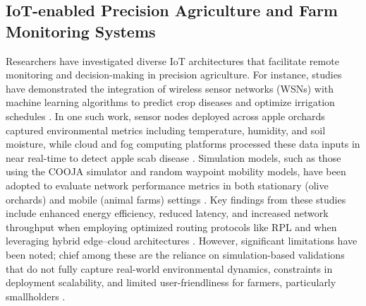 \documentclass[12pt,onecolumn]{IEEEtran} %
\begin{document}
\subsection{IoT-enabled Precision Agriculture and Farm Monitoring Systems}
Researchers have investigated diverse IoT architectures that facilitate remote monitoring and decision-making in precision agriculture. For instance, studies have demonstrated the integration of wireless sensor networks (WSNs) with machine learning algorithms to predict crop diseases and optimize irrigation schedules \cite{dhanaraju2022smartfarminginternet, akhter2022precisionagricultureusing}. In one such work, sensor nodes deployed across apple orchards captured environmental metrics including temperature, humidity, and soil moisture, while cloud and fog computing platforms processed these data inputs in near real-time to detect apple scab disease \cite{akhter2022precisionagricultureusing}. Simulation models, such as those using the COOJA simulator and random waypoint mobility models, have been adopted to evaluate network performance metrics in both stationary (olive orchards) and mobile (animal farms) settings \cite{jaliyagoda2023internetofthings, atalla2023iotenabledprecisionagriculture}. Key findings from these studies include enhanced energy efficiency, reduced latency, and increased network throughput when employing optimized routing protocols like RPL and when leveraging hybrid edge–cloud architectures \cite{atalla2023iotenabledprecisionagriculture, atalla2023iotenabledprecisionagriculture}. However, significant limitations have been noted; chief among these are the reliance on simulation-based validations that do not fully capture real-world environmental dynamics, constraints in deployment scalability, and limited user-friendliness for farmers, particularly smallholders \cite{bayih2022utilizationofinternet, atalla2023iotenabledprecisionagriculture}.
\end{document}
